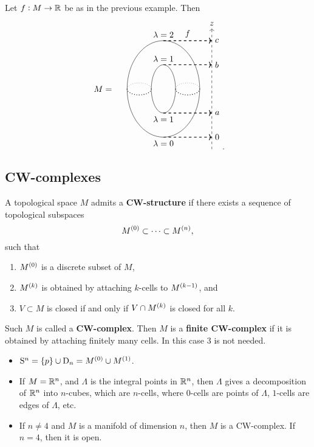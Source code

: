 \begin{example}
Let $ f : M \to \mathbb{R} $ be as in the previous example. Then
$$
\begin{tikzpicture}
\draw (-2.5, 0) node{$ M = $};
\draw (0, 0) ellipse (1.5 and 2);
\draw (0, 0) ellipse (0.5 and 1);
\draw [dotted, thick] (-1.5, 0) arc (-180:0:0.5 and 0.25);
\draw [dotted, thick] (0.5, 0) arc (-180:0:0.5 and 0.25);
\draw [dotted] (-1.5, 0) arc (180:0:0.5 and 0.25);
\draw [dotted] (0.5, 0) arc (180:0:0.5 and 0.25);
\draw [->, dashed] (2, -2.5) to (2, 2.5) node[above]{$ z $};
\draw (1, 2) node[above]{$ f $};
\draw [->, dashed, thick] (0, -2) node[below]{$ \lambda = 0 $} to (2, -2) node[right]{$ 0 $};
\draw [->, dashed, thick] (0, -1) node[below]{$ \lambda = 1 $} to (2, -1) node[right]{$ a $};
\draw [->, dashed, thick] (0, 1) node[above]{$ \lambda = 1 $} to (2, 1) node[right]{$ b $};
\draw [->, dashed, thick] (0, 2) node[above]{$ \lambda = 2 $} to (2, 2) node[right]{$ c $};
\end{tikzpicture}.
$$
\end{example}

\subsection{CW-complexes}

\begin{definition}
A topological space $ M $ admits a \textbf{CW-structure} if there exists a sequence of topological subspaces
$$ M^{\br{0}} \subset \dots \subset M^{\br{n}}, $$
such that
\begin{enumerate}
\item $ M^{\br{0}} $ is a discrete subset of $ M $,
\item $ M^{\br{k}} $ is obtained by attaching $ k $-cells to $ M^{\br{k - 1}} $, and
\item $ V \subset M $ is closed if and only if $ V \cap M^{\br{k}} $ is closed for all $ k $.
\end{enumerate}
Such $ M $ is called a \textbf{CW-complex}. Then $ M $ is a \textbf{finite CW-complex} if it is obtained by attaching finitely many cells. In this case $ 3 $ is not needed.
\end{definition}

\begin{example}
\hfill
\begin{itemize}
\item $ \S^n = \cbr{p} \cup \D_n = M^{\br{0}} \cup M^{\br{1}} $.
\item If $ M = \mathbb{R}^n $, and $ \Lambda $ is the integral points in $ \mathbb{R}^n $, then $ \Lambda $ gives a decomposition of $ \mathbb{R}^n $ into $ n $-cubes, which are $ n $-cells, where $ 0 $-cells are points of $ \Lambda $, $ 1 $-cells are edges of $ \Lambda $, etc.
\item If $ n \ne 4 $ and $ M $ is a manifold of dimension $ n $, then $ M $ is a CW-complex. If $ n = 4 $, then it is open.
\end{itemize}
\end{example}

